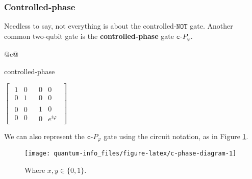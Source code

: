 \documentclass[fleqn]{article}
\newenvironment{idea}{\noindent}{\medskip}
\begin{document}
\hypertarget{controlled-phase}{%
\subsubsection{Controlled-phase}\label{controlled-phase}}

Needless to say, not everything is about the controlled-\(\texttt{NOT}\) gate.
Another common two-qubit gate is the \textbf{controlled-phase} gate \(\texttt{c-}P_\varphi\).

\begin{idea}

\begin{longtable}[]{@{}c@{}}
\toprule
\begin{minipage}[b]{(\columnwidth - 0\tabcolsep) * \real{1.00}}\centering
controlled-phase\strut
\end{minipage}\tabularnewline
\midrule
\endhead
\begin{minipage}[t]{(\columnwidth - 0\tabcolsep) * \real{1.00}}\centering
\(\left[\begin{array}{c|c}\begin{matrix}1&0\\0&1\end{matrix}&\begin{matrix}0&0\\0&0\end{matrix}\\\hline\begin{matrix}0&0\\0&0\end{matrix}&\begin{matrix}1&0\\0&e^{i\varphi}\end{matrix}\end{array}\right]\)\strut
\end{minipage}\tabularnewline
\bottomrule
\end{longtable}

\end{idea}

We can also represent the \(\texttt{c-}P_\varphi\) gate using the circuit notation, as in Figure \ref{fig:c-phase-diagram}.



\begin{figure}[H]

{\centering \texttt{[image: quantum-info\_files/figure-latex/c-phase-diagram-1]} 

}

\caption{Where \(x,y\in\{0,1\}\).}\label{fig:c-phase-diagram}
\end{figure}
\end{document}
